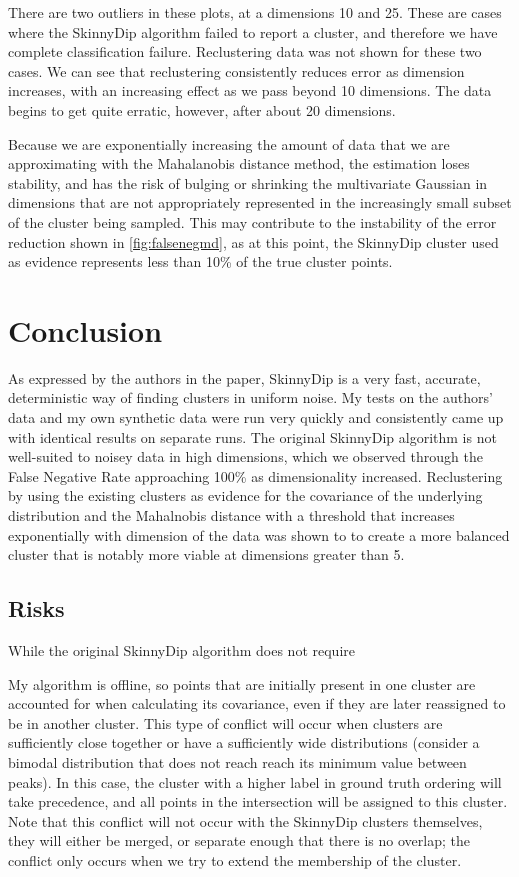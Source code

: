 \documentclass{sig-alternate-05-2015}
\begin{document}
There are two outliers in these plots, at a dimensions 10 and 25. These are cases where the SkinnyDip algorithm failed to report a cluster, and therefore we have complete classification failure. Reclustering data was not shown for these two cases. We can see that reclustering consistently reduces error as dimension increases, with an increasing effect as we pass beyond 10 dimensions. The data begins to get quite erratic, however, after about 20 dimensions. 

Because we are exponentially increasing the amount of data that we are approximating with the Mahalanobis distance method, the estimation loses stability, and has the risk of bulging or shrinking the multivariate Gaussian in dimensions that are not appropriately represented in the increasingly small subset of the cluster being sampled. This may contribute to the instability of the error reduction shown in \ref{fig:falsenegmd}, as at this point, the SkinnyDip cluster used as evidence represents less than 10\% of the true cluster points.

\section{Conclusion}
As expressed by the authors in the paper, SkinnyDip is a very fast, accurate, deterministic way of finding clusters in uniform noise. My tests on the authors' data and my own synthetic data were run very quickly and consistently came up with identical results on separate runs. The original SkinnyDip algorithm is not well-suited to noisey data in high dimensions, which we observed through the False Negative Rate approaching 100\% as dimensionality increased. Reclustering by using the existing clusters as evidence for the covariance of the underlying distribution and the Mahalnobis distance with a threshold that increases exponentially with dimension of the data was shown to to create a more balanced cluster that is notably more viable at dimensions greater than 5.
\subsection{Risks}
While the original SkinnyDip algorithm does not require 

My algorithm is offline, so points that are initially present in one cluster are accounted for when calculating its covariance, even if they are later reassigned to be in another cluster. This type of conflict will occur when clusters are sufficiently close together or have a sufficiently wide distributions (consider a bimodal distribution that does not reach reach its minimum value between peaks). In this case, the cluster with a higher label in ground truth ordering will take precedence, and all points in the intersection will be assigned to this cluster. Note that this conflict will not occur with the SkinnyDip clusters themselves, they will either be merged, or separate enough that there is no overlap; the conflict only occurs when we try to extend the membership of the cluster.
\end{document}
